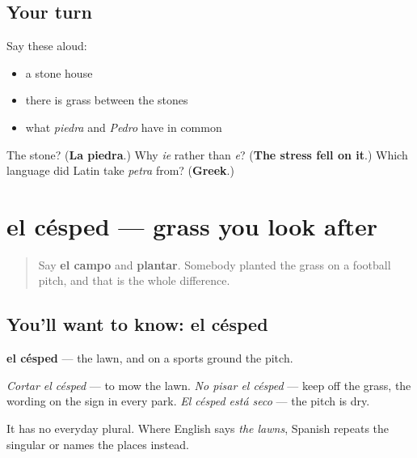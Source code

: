 \subsection*{Your turn}
Say these aloud:

\begin{itemize}
\raggedright
  \item a stone house
  \item there is grass between the stones
  \item what \emph{piedra} and \emph{Pedro} have in common
\end{itemize}

\begin{tcolorbox}[breakable,colback=teal!4,colframe=teal!35!black,title={Before you move on}]
The stone? (\textbf{La piedra}.) Why \emph{ie} rather than \emph{e}? (\textbf{The stress fell on it}.) Which language did Latin take \emph{petra} from? (\textbf{Greek}.)
\end{tcolorbox}
\section[el césped]{el césped — grass you look after}

\label{lesson:ES-C450-cesped}



\begin{quote}
Say \textbf{el campo} and \textbf{plantar}. Somebody planted the grass on a football pitch, and that is the whole difference.
\end{quote}

\subsection*{You'll want to know: el césped}
\textbf{el césped} — the lawn, and on a sports ground the pitch.

\emph{Cortar el césped} — to mow the lawn. \emph{No pisar el césped} — keep off the grass, the wording on the sign in every park. \emph{El césped está seco} — the pitch is dry.

It has no everyday plural. Where English says \emph{the lawns}, Spanish repeats the singular or names the places instead.

